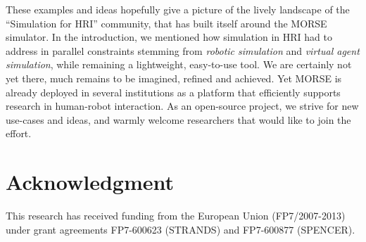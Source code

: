 \documentclass{llncs}
\begin{document}
These examples and ideas hopefully give a picture of the lively landscape of the
``Simulation for HRI'' community, that has built itself around the MORSE
simulator.  In the introduction, we mentioned how simulation in HRI had to
address in parallel constraints stemming from \emph{robotic simulation} and
\emph{virtual agent simulation}, while remaining a lightweight, easy-to-use
tool. We are certainly not yet there, much remains to be imagined, refined and
achieved.  Yet MORSE is already deployed in several institutions as a platform
that efficiently supports research in human-robot interaction. As an open-source
project, we strive for new use-cases and ideas, and warmly welcome researchers
that would like to join the effort.


\section*{Acknowledgment}

This research has received funding from the European
Union (FP7/2007-2013) under grant agreements
FP7-600623 (STRANDS) and FP7-600877 (SPENCER).



\end{document}
